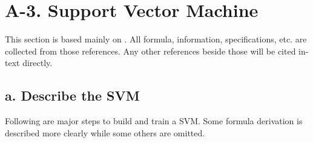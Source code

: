 \section*{A-3. Support Vector Machine}

This section is based mainly on \cite{Alexandre2017}. All formula, information, specifications, etc. are collected from those references. Any other references beside those will be cited in-text directly.

\subsection*{a. Describe the SVM}

Following are major steps to build and train a SVM. Some formula derivation is described more clearly while some others are omitted.

